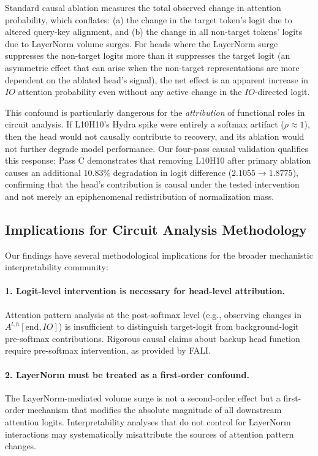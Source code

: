 \documentclass[12pt,a4paper]{article}
\begin{document}
Standard causal ablation measures the total observed change in attention
probability, which conflates: (a) the change in the target token's logit due to
altered query-key alignment, and (b) the change in all non-target tokens' logits
due to LayerNorm volume surges. For heads where the LayerNorm surge suppresses
the non-target logits more than it suppresses the target logit (an asymmetric
effect that can arise when the non-target representations are more dependent on
the ablated head's signal), the net effect is an apparent increase in $IO$
attention probability even without any active change in the $IO$-directed logit.

This confound is particularly dangerous for the \emph{attribution} of functional
roles in circuit analysis. If L10H10's Hydra spike were entirely a softmax
artifact ($\rho \approx 1$), then the head would not causally contribute to
recovery, and its ablation would not further degrade model performance. Our
four-pass causal validation qualifies this response: Pass C
demonstrates that removing L10H10 after primary ablation causes an additional
10.83\% degradation in logit difference ($2.1055 \to 1.8775$), confirming that
the head's contribution is causal under the tested intervention and not merely an
epiphenomenal redistribution of normalization mass.

\subsection{Implications for Circuit Analysis Methodology}

Our findings have several methodological implications for the broader
mechanistic interpretability community:

\paragraph{1. Logit-level intervention is necessary for head-level attribution.}
Attention pattern analysis at the post-softmax level (e.g., observing changes
in $A^{l,h}[\text{end}, IO]$) is insufficient to distinguish target-logit from
background-logit pre-softmax contributions. Rigorous causal claims about backup
head function require pre-softmax intervention, as provided by FALI.

\paragraph{2. LayerNorm must be treated as a first-order confound.}
The LayerNorm-mediated volume surge is not a second-order effect but a first-order
mechanism that modifies the absolute magnitude of all downstream attention logits.
Interpretability analyses that do not control for LayerNorm interactions
may systematically misattribute the sources of attention pattern changes.
\end{document}
